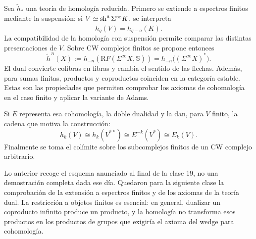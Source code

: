 Sea $\widetilde h_*$ una teoría de homología reducida. Primero se extiende a espectros finitos mediante la suspensión: si $V\simeq\operatorname{sh}^a\Sigma^\infty K$, se interpreta
\[
h_q(V)=\widetilde h_{q-a}(K).
\]
La compatibilidad de la homología con suspensión permite comparar las distintas presentaciones de $V$. Sobre CW complejos finitos se propone entonces
\[
\widetilde h^{\,n}(X):=
h_{-n}\!\left(\mathrm RF(\Sigma^\infty X,\mathbb S)\right)
=h_{-n}\bigl((\Sigma^\infty X)^*\bigr).
\]
El dual convierte cofibras en fibras y cambia el sentido de las flechas. Además, para sumas finitas, productos y coproductos coinciden en la categoría estable. Estas son las propiedades que permiten comprobar los axiomas de cohomología en el caso finito y aplicar la variante de Adams.

Si $E$ representa esa cohomología, la doble dualidad y la  dan, para $V$ finito, la cadena que motiva la construcción:
\[
h_k(V)\cong h_k(V^{**})
\cong E^{-k}(V^*)\cong E_k(V).
\]
Finalmente se toma el colímite sobre los subcomplejos finitos de un CW complejo arbitrario.
\begin{nota}
Lo anterior recoge el esquema anunciado al final de la clase 19, no una demostración completa dada ese día. Quedaron para la siguiente clase la comprobación de la extensión a espectros finitos y de los axiomas de la teoría dual. La restricción a objetos finitos es esencial: en general, dualizar un coproducto infinito produce un producto, y la homología no transforma esos productos en los productos de grupos que exigiría el axioma del wedge para cohomología.
\end{nota}
